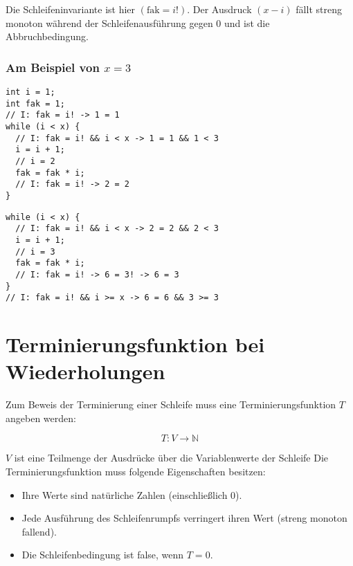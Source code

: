 \documentclass{lehramt-informatik-haupt}
\begin{document}
\noindent
Die Schleifeninvariante ist hier $(\text{fak} = i!)$. Der Ausdruck $(x -
i)$ fällt streng monoton während der Schleifenausführung gegen $0$ und
ist die Abbruchbedingung.

\subsubsection{Am Beispiel von $x = 3$}

\begin{multicols}{2}

\begin{verbatim}
int i = 1;
int fak = 1;
// I: fak = i! -> 1 = 1
while (i < x) {
  // I: fak = i! && i < x -> 1 = 1 && 1 < 3
  i = i + 1;
  // i = 2
  fak = fak * i;
  // I: fak = i! -> 2 = 2
}
\end{verbatim}


\begin{verbatim}
while (i < x) {
  // I: fak = i! && i < x -> 2 = 2 && 2 < 3
  i = i + 1;
  // i = 3
  fak = fak * i;
  // I: fak = i! -> 6 = 3! -> 6 = 3
}
// I: fak = i! && i >= x -> 6 = 6 && 3 >= 3
\end{verbatim}

\end{multicols}

%

\section{Terminierungsfunktion bei Wiederholungen}

Zum Beweis der Terminierung einer Schleife muss eine
Terminierungsfunktion $T$ angeben werden:

\begin{displaymath}
T \colon V \rightarrow \mathbb{N}
\end{displaymath}

$V$ ist eine Teilmenge der Ausdrücke über die Variablenwerte der Schleife
Die Terminierungsfunktion muss folgende Eigenschaften besitzen:

\begin{itemize}
\item Ihre Werte sind natürliche Zahlen (einschließlich 0).

\item Jede Ausführung des Schleifenrumpfs verringert ihren Wert (streng
monoton fallend).

\item Die Schleifenbedingung ist false, wenn $T = 0$.
\end{itemize}
\end{document}
